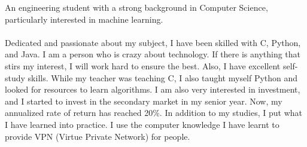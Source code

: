 \documentclass[letter,10pt]{article}
\begin{document}
An engineering student with a strong background in Computer Science, particularly interested in machine
learning.\\
~\\
Dedicated and passionate about my subject, I have been skilled with C, Python, and Java. I am a person who
is crazy about technology. If there is anything that stirs my interest, I will work hard to ensure the best. Also,
I have excellent self-study skills. While my teacher was teaching C, I also taught myself Python and looked
for resources to learn algorithms. I am also very interested in investment, and I started to invest in the
secondary market in my senior year. Now, my annualized rate of return has reached 20\%. In addition to my
studies, I put what I have learned into practice. I use the computer knowledge I have learnt to provide VPN
(Virtue Private Network) for people.
\end{document}
